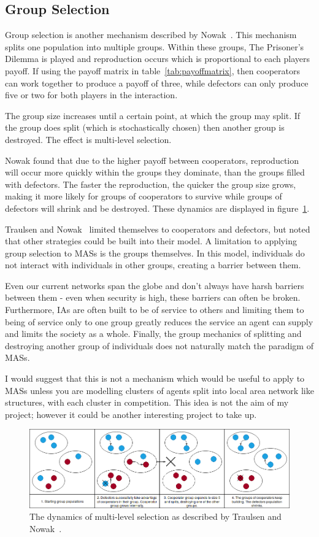 \documentclass[]{final_report}
\begin{document}
\subsection{Group Selection}
\label{appendix:groupselection}
Group selection is another mechanism described by Nowak~\cite{five_rules_coop}. This mechanism splits one population into multiple groups. Within these groups, The Prisoner's Dilemma is played and reproduction occurs which is proportional to each players payoff. If using the payoff matrix in table~\ref{tab:payoffmatrix}, then cooperators can work together to produce a payoff of three, while defectors can only produce five or two for both players in the interaction.\par
The group size increases until a certain point, at which the group may split. If the group does split (which is stochastically chosen) then another group is destroyed. The effect is multi-level selection.\par
Nowak found that due to the higher payoff between cooperators, reproduction will occur more quickly within the groups they dominate, than the groups filled with defectors. The faster the reproduction, the quicker the group size grows, making it more likely for groups of cooperators to survive while groups of defectors will shrink and be destroyed. These dynamics are displayed in figure~\ref{fig:group}.\par
Traulsen and Nowak~\cite{multilevel_nowak} limited themselves to cooperators and defectors, but noted that other strategies could be built into their model. A limitation to applying group selection to MASs is the groups themselves. In this model, individuals do not interact with individuals in other groups, creating a barrier between them.\par
Even our current networks span the globe and don't always have harsh barriers between them - even when security is high, these barriers can often be broken. Furthermore, IAs are often built to be of service to others and limiting them to being of service only to one group greatly reduces the service an agent can supply and limits the society as a whole. Finally, the group mechanics of splitting and destroying another group of individuals does not naturally match the paradigm of MASs.\par
I would suggest that this is not a mechanism which would be useful to apply to MASs unless you are modelling clusters of agents split into local area network like structures, with each cluster in competition. This idea is not the aim of my project; however it could be another interesting project to take up.
\begin{figure}
	\center
	\includegraphics[width=\textwidth]{GroupSelection.png}
	\caption{The dynamics of multi-level selection as described by Traulsen and Nowak~\cite{multilevel_nowak}.}
	\label{fig:group}
\end{figure}
\end{document}
